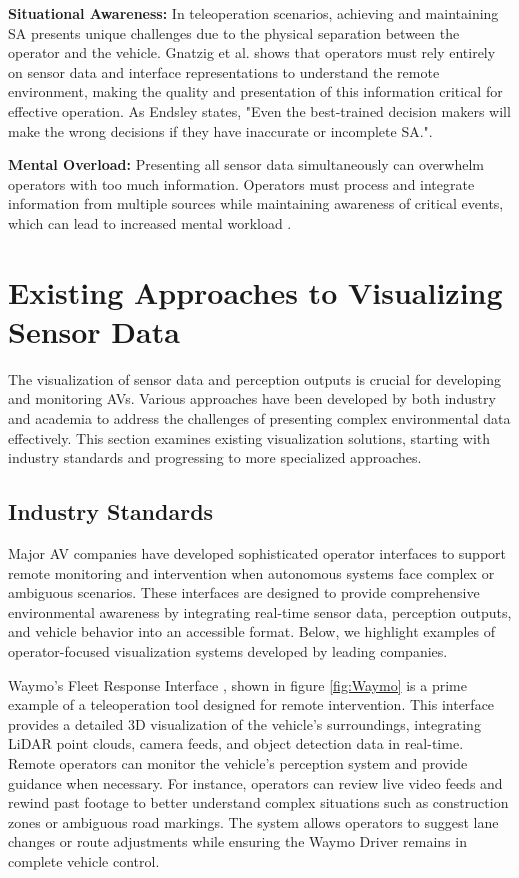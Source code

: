 \textbf{Situational Awareness:} In teleoperation scenarios, achieving and maintaining \ac{SA} presents unique challenges due to the physical separation between the operator and the vehicle. Gnatzig et al. \cite{Gnatzig} shows that operators must rely entirely on sensor data and interface representations to understand the remote environment, making the quality and presentation of this information critical for effective operation.  As Endsley \cite{endsley1995toward} states, "Even the
best-trained decision makers will make the wrong decisions if they have inaccurate or incomplete SA.".

\textbf{Mental Overload:} Presenting all sensor data simultaneously can overwhelm operators with too much information.
Operators must process and integrate information from multiple sources while maintaining awareness of critical events, which can lead to increased mental workload \cite{wickens2008multiple}.

\section{Existing Approaches to Visualizing Sensor Data}
The visualization of sensor data and perception outputs is crucial for developing and monitoring \acp{AV}. Various approaches have been developed by both industry and academia to address the challenges of presenting complex environmental data effectively. This section examines existing visualization solutions, starting with industry standards and progressing to more specialized approaches.
\subsection{Industry Standards}
Major \ac{AV} companies have developed sophisticated operator interfaces to support remote monitoring and intervention when autonomous systems face complex or ambiguous scenarios. These interfaces are designed to provide comprehensive environmental awareness by integrating real-time sensor data, perception outputs,
and vehicle behavior into an accessible format. Below, we highlight examples of operator-focused visualization systems developed by leading companies.

Waymo's Fleet Response Interface \cite{waymo2024fleetresponse}, shown in figure \ref{fig:Waymo} is a prime example of a teleoperation tool designed for remote intervention. This interface provides a detailed 3D visualization of the vehicle’s surroundings, integrating LiDAR point clouds, camera feeds, and object detection data in real-time. Remote operators can monitor the vehicle’s perception system and provide guidance when necessary. For instance, operators can review live video feeds and rewind past footage to better understand complex situations such as construction zones or ambiguous road markings. The system allows operators to suggest lane changes or route adjustments while ensuring the Waymo Driver remains in complete vehicle control.

